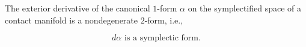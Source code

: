 The exterior derivative of the canonical $1$-form $\alpha$ on the symplectified space of a contact manifold is a nondegenerate $2$-form, i.e.,

$$d\alpha \text{ is a symplectic form.}$$
